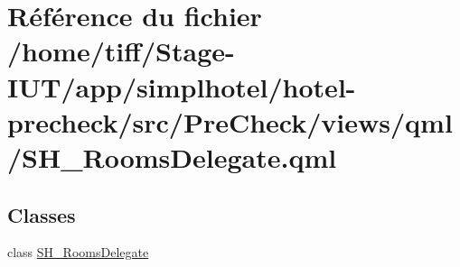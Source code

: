 \hypertarget{SH__RoomsDelegate_8qml}{\section{Référence du fichier /home/tiff/\-Stage-\/\-I\-U\-T/app/simplhotel/hotel-\/precheck/src/\-Pre\-Check/views/qml/\-S\-H\-\_\-\-Rooms\-Delegate.qml}
\label{SH__RoomsDelegate_8qml}
}
\subsection*{Classes}
\begin{DoxyCompactItemize}
\item 
class \hyperlink{classSH__RoomsDelegate}{S\-H\-\_\-\-Rooms\-Delegate}
\end{DoxyCompactItemize}
